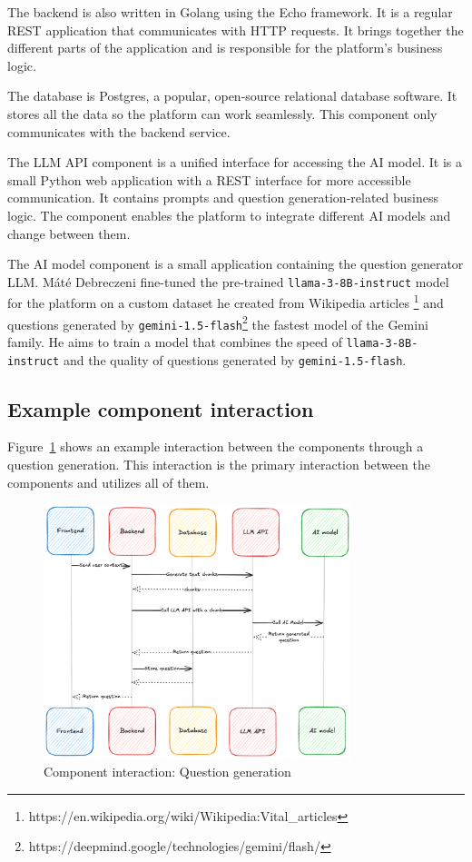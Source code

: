 The backend is also written in Golang using the Echo framework. It is a regular REST application that communicates with HTTP requests. It brings together the different parts of the application and is responsible for the platform's business logic.

The database is Postgres, a popular, open-source relational database software. It stores all the data so the platform can work seamlessly. This component only communicates with the backend service.

The LLM API component is a unified interface for accessing the AI model. It is a small Python web application with a REST interface for more accessible communication. It contains prompts and question generation-related business logic. The component enables the platform to integrate different AI models and change between them.

The AI model component is a small application containing the question generator LLM. Máté Debreczeni fine-tuned the pre-trained \texttt{llama-3-8B-instruct} model for the platform on a custom dataset he created from Wikipedia articles \footnote{https://en.wikipedia.org/wiki/Wikipedia:Vital_articles} and questions generated by \texttt{gemini-1.5-flash}\footnote{https://deepmind.google/technologies/gemini/flash/} the fastest model of the Gemini family. He aims to train a model that combines the speed of \texttt{llama-3-8B-instruct} and the quality of questions generated by \texttt{gemini-1.5-flash}.

\subsection{Example component interaction}

Figure~\ref{fig:component-interaction} shows an example interaction between the components through a question generation. This interaction is the primary interaction between the components and utilizes all of them.

\begin{figure}[!h]
    \centering
    \includegraphics[width=0.8\textwidth, keepaspectratio]{figures/component-interaction.png}
    \caption{Component interaction: Question generation}
    \label{fig:component-interaction}
\end{figure}

